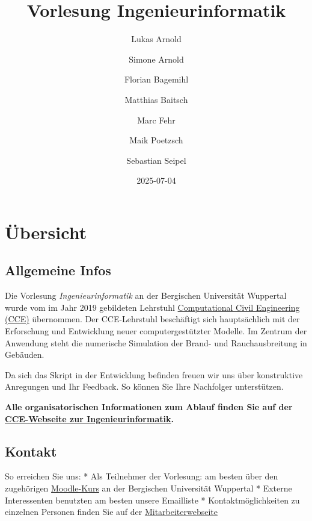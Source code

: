 \documentclass[
  letterpaper,
  DIV=11,
  numbers=noendperiod]{scrreprt}
\title{Vorlesung Ingenieurinformatik}
\author{Lukas Arnold \and Simone Arnold \and Florian
Bagemihl \and Matthias Baitsch \and Marc Fehr \and Maik
Poetzsch \and Sebastian Seipel}
\date{2025-07-04}
\renewcommand*\contentsname{Table of contents}
\newcommand\contentsname{Table of contents}
\begin{document}
\maketitle

\renewcommand*\contentsname{Table of contents}
{
\hypersetup{linkcolor=}
\setcounter{tocdepth}{2}
\tableofcontents
}


\chapter*{Übersicht}\label{uxfcbersicht}


\section*{Allgemeine Infos}\label{allgemeine-infos}


Die Vorlesung \emph{Ingenieurinformatik} an der Bergischen Universität
Wuppertal wurde vom im Jahr 2019 gebildeten Lehrstuhl
\href{https://cce.uni-wuppertal.de/}{Computational Civil Engineering
(CCE)} übernommen. Der CCE-Lehrstuhl beschäftigt sich hauptsächlich mit
der Erforschung und Entwicklung neuer computergestützter Modelle. Im
Zentrum der Anwendung steht die numerische Simulation der Brand- und
Rauchausbreitung in Gebäuden.

Da sich das Skript in der Entwicklung befinden freuen wir uns über
konstruktive Anregungen und Ihr Feedback. So können Sie Ihre Nachfolger
unterstützen.

\textbf{Alle organisatorischen Informationen zum Ablauf finden Sie auf
der
\href{https://cce.uni-wuppertal.de/index.php?id=4178&L=0}{CCE-Webseite
zur Ingenieurinformatik}.}

\section*{Kontakt}\label{kontakt}


So erreichen Sie uns: * Als Teilnehmer der Vorlesung: am besten über den
zugehörigen
\href{https://moodle.uni-wuppertal.de/course/view.php?id=46894}{Moodle-Kurs}
an der Bergischen Universität Wuppertal * Externe Interessenten
benutzten am besten unsere Emailliste * Kontaktmöglichkeiten zu
einzelnen Personen finden Sie auf der
\href{https://cce.uni-wuppertal.de/de/team/}{Mitarbeiterwebseite}
\end{document}
